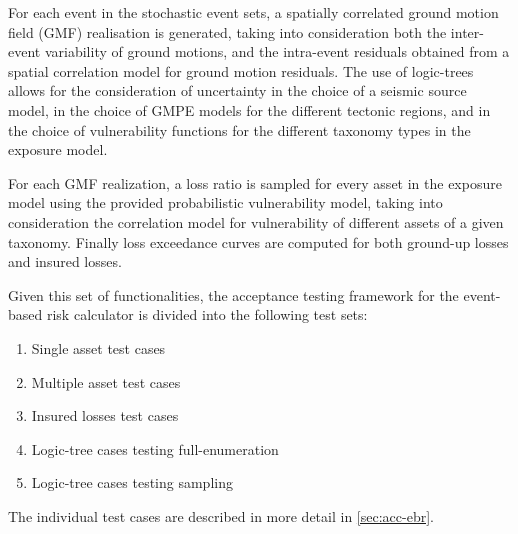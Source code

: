 For each event in the stochastic event sets, a spatially correlated ground motion field (GMF) realisation is generated, taking into consideration both the inter-event variability of ground motions, and the intra-event residuals obtained from a spatial correlation model for ground motion residuals. The use of logic-trees allows for the consideration of uncertainty in the choice of a seismic source model, in the choice of GMPE models for the different tectonic regions, and in the choice of vulnerability functions for the different taxonomy types in the exposure model.

For each GMF realization, a loss ratio is sampled for every asset in the exposure model using the provided probabilistic vulnerability model, taking into consideration the correlation model for vulnerability of different assets of a given taxonomy. Finally loss exceedance curves are computed for both ground-up losses and insured losses.

Given this set of functionalities, the acceptance testing framework for the event-based risk calculator is divided into the following  test sets:

\begin{enumerate}
	\item Single asset test cases
	\item Multiple asset test cases
	\item Insured losses test cases
	\item Logic-tree cases testing full-enumeration
	\item Logic-tree cases testing sampling
\end{enumerate}

The individual test cases are described in more detail in \ref{sec:acc-ebr}.